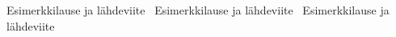 \documentclass[finnish]{tktltiki2}
\theoremstyle{definition}
\theoremstyle{remark}
\begin{document}
 





Esimerkkilause ja lähdeviite~\cite{Zhang:2011:ECL:2047594.2047666}
Esimerkkilause ja lähdeviite~\cite{Dhomne:2012:ITL:2382887.2382899}
Esimerkkilause ja lähdeviite~\cite{Li:2006:MOS:1125170.1125182}






%

%
% 
%



\end{document}
